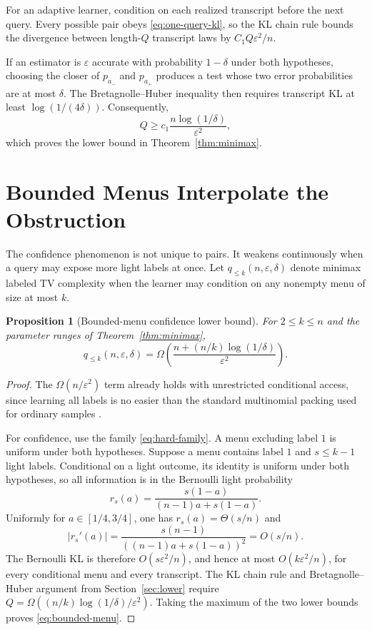 \documentclass[twoside]{article}
\newtheorem{proposition}[theorem]{Proposition}
\begin{document}
For an adaptive learner, condition on each realized transcript before the next query. Every possible pair obeys \eqref{eq:one-query-kl}, so the KL chain rule bounds the divergence between length-$Q$ transcript laws by $C_1Q\varepsilon^2/n$.

If an estimator is $\varepsilon$ accurate with probability $1-\delta$ under both hypotheses, choosing the closer of $p_{a_-}$ and $p_{a_+}$ produces a test whose two error probabilities are at most $\delta$. The Bretagnolle--Huber inequality then requires transcript KL at least $\log(1/(4\delta))$. Consequently, \[ Q\ge c_1\frac{n\log(1/\delta)}{\varepsilon^2}, \] which proves the lower bound in Theorem~\ref{thm:minimax}.

\section{Bounded Menus Interpolate the Obstruction}
\label{sec:bounded-menu}

The confidence phenomenon is not unique to pairs. It weakens continuously when a query may expose more light labels at once. Let $q_{\le k}(n,\varepsilon,\delta)$ denote minimax labeled TV complexity when the learner may condition on any nonempty menu of size at most $k$.

\begin{proposition}[Bounded-menu confidence lower bound]
\label{prop:bounded-menu}
For $2\le k\le n$ and the parameter ranges of Theorem~\ref{thm:minimax},
\begin{equation}
 q_{\le k}(n,\varepsilon,\delta)
 =\Omega\!\left(
 \frac{n+(n/k)\log(1/\delta)}{\varepsilon^2}
 \right).
 \label{eq:bounded-menu}
\end{equation}
\end{proposition}

\begin{proof}
The $\Omega(n/\varepsilon^2)$ term already holds with unrestricted conditional access, since learning all labels is no easier than the standard multinomial packing used for ordinary samples \citep{canonne2020short,kleinberg2026providers}.

For confidence, use the family \eqref{eq:hard-family}. A menu excluding label $1$ is uniform under both hypotheses. Suppose a menu contains label $1$ and $s\le k-1$ light labels. Conditional on a light outcome, its identity is uniform under both hypotheses, so all information is in the Bernoulli light probability
\begin{equation}
 r_s(a)=\frac{s(1-a)}{(n-1)a+s(1-a)}.
 \label{eq:rs}
\end{equation}
Uniformly for $a\in[1/4,3/4]$, one has $r_s(a)=\Theta(s/n)$ and \[ |r_s'(a)| =\frac{s(n-1)}{((n-1)a+s(1-a))^2} =O(s/n). \] The Bernoulli KL is therefore $O(s\varepsilon^2/n)$, and hence at most $O(k\varepsilon^2/n)$, for every conditional menu and every transcript. The KL chain rule and Bretagnolle--Huber argument from Section~\ref{sec:lower} require $Q=\Omega((n/k)\log(1/\delta)/\varepsilon^2)$. Taking the maximum of the two lower bounds proves \eqref{eq:bounded-menu}.
\end{proof}
\end{document}
